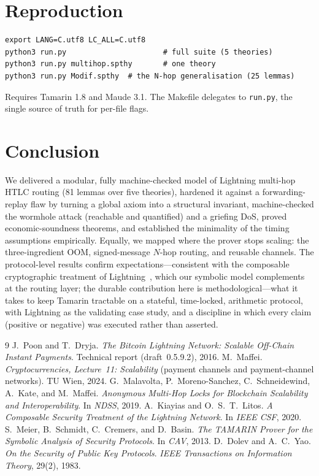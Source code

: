 \documentclass[11pt]{article}
\begin{document}
\section{Reproduction}

\begin{lstlisting}
export LANG=C.utf8 LC_ALL=C.utf8
python3 run.py                      # full suite (5 theories)
python3 run.py multihop.spthy       # one theory
python3 run.py Modif.spthy  # the N-hop generalisation (25 lemmas)
\end{lstlisting}
Requires Tamarin 1.8 and Maude 3.1. The Makefile delegates to \texttt{run.py},
the single source of truth for per-file flags.

\section{Conclusion}

We delivered a modular, fully machine-checked model of Lightning multi-hop HTLC
routing (81 lemmas over five theories), hardened it against a forwarding-replay
flaw by turning a global axiom into a structural invariant, machine-checked the
wormhole attack (reachable and quantified) and a griefing DoS, proved
economic-soundness theorems, and established the minimality of the timing
assumptions empirically. Equally, we mapped where the prover stops scaling: the
three-ingredient OOM, signed-message $N$-hop routing, and reusable channels.
The protocol-level results confirm expectations---consistent with the
composable cryptographic treatment of Lightning~\cite{kiayias-litos}, which our
symbolic model complements at the routing layer; the durable contribution here
is methodological---what it takes to keep Tamarin tractable on a stateful,
time-locked, arithmetic protocol, with Lightning as the validating case study,
and a discipline in which every claim (positive or negative) was executed rather
than asserted.

\begin{thebibliography}{9}
 J.~Poon and T.~Dryja.
  \emph{The Bitcoin Lightning Network: Scalable Off-Chain Instant Payments}.
  Technical report (draft~0.5.9.2), 2016.
 M.~Maffei.
  \emph{Cryptocurrencies, Lecture~11: Scalability} (payment channels and
  payment-channel networks). TU Wien, 2024.
 G.~Malavolta, P.~Moreno-Sanchez, C.~Schneidewind, A.~Kate,
  and M.~Maffei.
  \emph{Anonymous Multi-Hop Locks for Blockchain Scalability and
  Interoperability}. In \emph{NDSS}, 2019.
 A.~Kiayias and O.~S.~T.~Litos.
  \emph{A Composable Security Treatment of the Lightning Network}. In
  \emph{IEEE CSF}, 2020.
 S.~Meier, B.~Schmidt, C.~Cremers, and D.~Basin.
  \emph{The TAMARIN Prover for the Symbolic Analysis of Security Protocols}.
  In \emph{CAV}, 2013.
 D.~Dolev and A.~C.~Yao.
  \emph{On the Security of Public Key Protocols}.
  \emph{IEEE Transactions on Information Theory}, 29(2), 1983.
\end{thebibliography}
\end{document}
